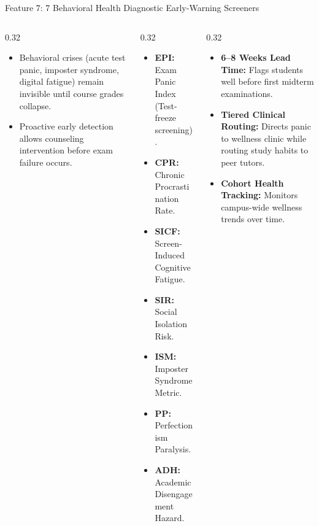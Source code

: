 \documentclass[aspectratio=169,10pt]{beamer}
\newcommand{\whybox}[2]{
  \begin{tcolorbox}[colframe=whyframe,colbacktitle=whyframe,colback=whybg,title=\textbf{WHY? The Problem \& Need (#1)}]
  \scriptsize #2
  \end{tcolorbox}
}
\newcommand{\howbox}[2]{
  \begin{tcolorbox}[colframe=howframe,colbacktitle=howframe,colback=howbg,title=\textbf{HOW? The Technology \& Algorithms (#1)}]
  \scriptsize #2
  \end{tcolorbox}
}
\newcommand{\outbox}[2]{
  \begin{tcolorbox}[colframe=outframe,colbacktitle=outframe,colback=outbg,title=\textbf{OUTCOMES? Measurable Impact \& Results (#1)}]
  \scriptsize #2
  \end{tcolorbox}
}
\begin{document}
\begin{frame}{Feature 7: 7 Behavioral Health Diagnostic Early-Warning Screeners}
\begin{columns}[T]
\begin{column}{0.32\textwidth}
\whybox{Catching Silent Crises}{
\begin{itemize}
    \item Behavioral crises (acute test panic, imposter syndrome, digital fatigue) remain invisible until course grades collapse.
    \item Proactive early detection allows counseling intervention before exam failure occurs.
\end{itemize}
}
\end{column}

\begin{column}{0.32\textwidth}
\howbox{7 Automated Screeners}{
\begin{itemize}
    \item \textbf{EPI:} Exam Panic Index (Test-freeze screening).
    \item \textbf{CPR:} Chronic Procrastination Rate.
    \item \textbf{SICF:} Screen-Induced Cognitive Fatigue.
    \item \textbf{SIR:} Social Isolation Risk.
    \item \textbf{ISM:} Imposter Syndrome Metric.
    \item \textbf{PP:} Perfectionism Paralysis.
    \item \textbf{ADH:} Academic Disengagement Hazard.
\end{itemize}
}
\end{column}

\begin{column}{0.32\textwidth}
\outbox{Proactive Prevention}{
\begin{itemize}
    \item \textbf{6--8 Weeks Lead Time:} Flags students well before first midterm examinations.
    \item \textbf{Tiered Clinical Routing:} Directs panic to wellness clinic while routing study habits to peer tutors.
    \item \textbf{Cohort Health Tracking:} Monitors campus-wide wellness trends over time.
\end{itemize}
}
\end{column}
\end{columns}
\end{frame}
\end{document}
